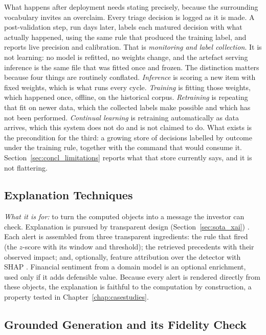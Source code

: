 What happens after deployment needs stating precisely, because the surrounding vocabulary invites an
overclaim. Every triage decision is logged as it is made. A post-validation step, run days later, labels
each matured decision with what actually happened, using the same rule that produced the training label,
and reports live precision and calibration. That is \emph{monitoring and label collection}. It is not
learning: no model is refitted, no weights change, and the artefact serving inference is the same file
that was fitted once and frozen. The distinction matters because four things are routinely conflated.
\emph{Inference} is scoring a new item with fixed weights, which is what runs every cycle.
\emph{Training} is fitting those weights, which happened once, offline, on the historical corpus.
\emph{Retraining} is repeating that fit on newer data, which the collected labels make possible and
which has not been performed. \emph{Continual learning} is retraining automatically as data arrives,
which this system does not do and is not claimed to do. What exists is the precondition for the third:
a growing store of decisions labelled by outcome under the training rule, together with the command
that would consume it. Section~\ref{sec:concl_limitations} reports what that store currently says, and
it is not flattering.

\subsection{Explanation Techniques}
\label{sec:met_xai}

\emph{What it is for:} to turn the computed objects into a message the investor can check. Explanation is
pursued by transparent design (Section~\ref{sec:sota_xai}) \autocite{rudin2019stop, arrieta2020xai}. Each
alert is assembled from three transparent ingredients: the rule that fired (the $z$-score with its window
and threshold); the retrieved precedents with their observed impact; and, optionally, feature attribution
over the detector with SHAP \autocite{lundberg2017shap}. Financial sentiment from a domain model
\autocite{araci2019finbert} is an optional enrichment, used only if it adds defensible value. Because every
alert is rendered directly from these objects, the explanation is faithful to the computation by
construction, a property tested in Chapter~\ref{chap:casestudies}.

\subsection{Grounded Generation and its Fidelity Check}
\label{sec:met_generation}

